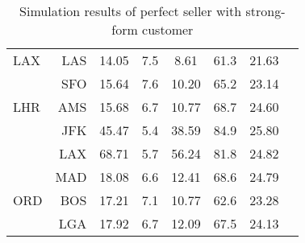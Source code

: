 \begin{table}[h]
\begin{center}
\begin{tabular}{l r c c c c c c}
LAX  &  LAS &   14.05  &     7.5  &    8.61  &    61.3  &   21.63  \\
     &  SFO &   15.64  &     7.6  &   10.20  &    65.2  &   23.14  \\[.5ex]
LHR  &  AMS &   15.68  &     6.7  &   10.77  &    68.7  &   24.60  \\
     &  JFK &   45.47  &     5.4  &   38.59  &    84.9  &   25.80  \\
     &  LAX &   68.71  &     5.7  &   56.24  &    81.8  &   24.82  \\
     &  MAD &   18.08  &     6.6  &   12.41  &    68.6  &   24.79  \\[.5ex]
ORD  &  BOS &   17.21  &     7.1  &   10.77  &    62.6  &   23.28  \\
     &  LGA &   17.92  &     6.7  &   12.09  &    67.5  &   24.13  \\
            \bottomrule
        \end{tabular}
        \caption{Simulation results of perfect seller with strong-form customer}
        \label{tbl:resultsPerfectStrong}
    \end{center}
\end{table}



